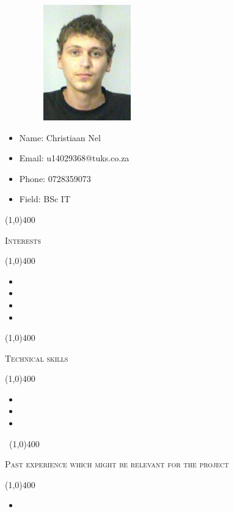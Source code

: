 \documentclass[12pt,a4paper]{report}
\begin{document}
\begin{minipage}{0.5\textwidth}
\begin{figure}[H]
\includegraphics[width=5cm,height=5cm,keepaspectratio]{u14029368.jpeg}
\end{figure}
\end{minipage} \hfill
\begin{minipage}{0.6\textwidth}
\begin{itemize}
\item[] Name: Christiaan Nel
\item[] Email: u14029368@tuks.co.za
\item[] Phone: 0728359073
\item[] Field: BSc IT
\end{itemize}
\end{minipage}

\begin{center}
	
	\line(1,0){400}\\
	{\scshape\large Interests\par}
	\line(1,0){400}\\
	\end{center}
	\begin{itemize}
\item 
\item 
\item 
\item 
\end{itemize}
	
	\begin{center}
	
	\line(1,0){400}\\
	{\scshape\large Technical skills\par}
	\line(1,0){400}\\
	\end{center}
		\begin{itemize}
\item 
\item 
\item  
\end{itemize}
\newpage
\begin{center}
	\vspace*{-3cm}\
	\line(1,0){400}\\
	{\scshape\large Past experience which might be relevant for the project\par}
	\line(1,0){400}\\
	\end{center}
		\begin{itemize}
\item 

\end{itemize}
\end{document}
